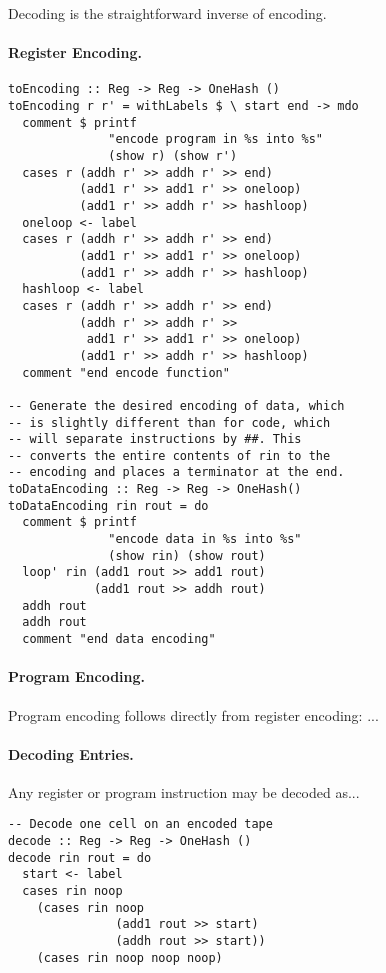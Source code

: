 \documentclass[10pt, preprint, nocopyrightspace]{sigplanconf}
\begin{document}
Decoding is the straightforward inverse of encoding. 



\paragraph{Register Encoding.}

\begin{lstlisting}
toEncoding :: Reg -> Reg -> OneHash ()
toEncoding r r' = withLabels $ \ start end -> mdo
  comment $ printf
              "encode program in %s into %s"
              (show r) (show r')
  cases r (addh r' >> addh r' >> end)
          (add1 r' >> add1 r' >> oneloop)
          (add1 r' >> addh r' >> hashloop)
  oneloop <- label
  cases r (addh r' >> addh r' >> end)
          (add1 r' >> add1 r' >> oneloop)
          (add1 r' >> addh r' >> hashloop)
  hashloop <- label
  cases r (addh r' >> addh r' >> end)
          (addh r' >> addh r' >>
           add1 r' >> add1 r' >> oneloop)
          (add1 r' >> addh r' >> hashloop)
  comment "end encode function"

-- Generate the desired encoding of data, which
-- is slightly different than for code, which
-- will separate instructions by ##. This
-- converts the entire contents of rin to the
-- encoding and places a terminator at the end.
toDataEncoding :: Reg -> Reg -> OneHash()
toDataEncoding rin rout = do
  comment $ printf
              "encode data in %s into %s"
              (show rin) (show rout)
  loop' rin (add1 rout >> add1 rout)
            (add1 rout >> addh rout)
  addh rout
  addh rout
  comment "end data encoding"
\end{lstlisting}

\paragraph{Program Encoding.}

Program encoding follows directly from register encoding: ...

\paragraph{Decoding Entries.}

Any register or program instruction may be decoded as...

\begin{lstlisting}
-- Decode one cell on an encoded tape
decode :: Reg -> Reg -> OneHash ()
decode rin rout = do
  start <- label
  cases rin noop
    (cases rin noop
               (add1 rout >> start)
               (addh rout >> start))
    (cases rin noop noop noop)
\end{lstlisting}
\end{document}
